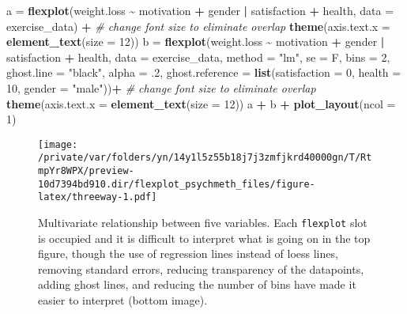 \documentclass[
  english,
  man]{apa6}
\newenvironment{Shaded}{\begin{snugshade}}{\end{snugshade}}
\newcommand{\CommentTok}[1]{\textcolor[rgb]{0.56,0.35,0.01}{\textit{#1}}}
\newcommand{\DataTypeTok}[1]{\textcolor[rgb]{0.13,0.29,0.53}{#1}}
\newcommand{\DecValTok}[1]{\textcolor[rgb]{0.00,0.00,0.81}{#1}}
\newcommand{\FloatTok}[1]{\textcolor[rgb]{0.00,0.00,0.81}{#1}}
\newcommand{\KeywordTok}[1]{\textcolor[rgb]{0.13,0.29,0.53}{\textbf{#1}}}
\newcommand{\NormalTok}[1]{#1}
\newcommand{\OperatorTok}[1]{\textcolor[rgb]{0.81,0.36,0.00}{\textbf{#1}}}
\newcommand{\StringTok}[1]{\textcolor[rgb]{0.31,0.60,0.02}{#1}}
\begin{document}
\begin{Shaded}
\begin{Highlighting}[]
\NormalTok{a =}\StringTok{ }\KeywordTok{flexplot}\NormalTok{(weight.loss }\OperatorTok{\textasciitilde{}}\StringTok{ }\NormalTok{motivation }\OperatorTok{+}\StringTok{ }\NormalTok{gender }\OperatorTok{|}\StringTok{ }\NormalTok{satisfaction }\OperatorTok{+}\StringTok{ }\NormalTok{health, }
    \DataTypeTok{data =}\NormalTok{ exercise\_data) }\OperatorTok{+}
\StringTok{  }\CommentTok{\# change font size to eliminate overlap}
\StringTok{    }\KeywordTok{theme}\NormalTok{(}\DataTypeTok{axis.text.x =} 
            \KeywordTok{element\_text}\NormalTok{(}\DataTypeTok{size =} \DecValTok{12}\NormalTok{))}
\NormalTok{b =}\StringTok{ }\KeywordTok{flexplot}\NormalTok{(weight.loss }\OperatorTok{\textasciitilde{}}\StringTok{ }\NormalTok{motivation }\OperatorTok{+}\StringTok{ }\NormalTok{gender }\OperatorTok{|}\StringTok{ }\NormalTok{satisfaction }\OperatorTok{+}\StringTok{ }\NormalTok{health, }
    \DataTypeTok{data =}\NormalTok{ exercise\_data, }
    \DataTypeTok{method =} \StringTok{"lm"}\NormalTok{, }\DataTypeTok{se =}\NormalTok{ F, }\DataTypeTok{bins =} \DecValTok{2}\NormalTok{, }\DataTypeTok{ghost.line =} \StringTok{"black"}\NormalTok{, }\DataTypeTok{alpha =} \FloatTok{.2}\NormalTok{,}
    \DataTypeTok{ghost.reference =} \KeywordTok{list}\NormalTok{(}\DataTypeTok{satisfaction =} \DecValTok{0}\NormalTok{, }\DataTypeTok{health =} \DecValTok{10}\NormalTok{, }\DataTypeTok{gender =} \StringTok{"male"}\NormalTok{))}\OperatorTok{+}
\StringTok{  }\CommentTok{\# change font size to eliminate overlap}
\StringTok{    }\KeywordTok{theme}\NormalTok{(}\DataTypeTok{axis.text.x =} 
            \KeywordTok{element\_text}\NormalTok{(}\DataTypeTok{size =} \DecValTok{12}\NormalTok{))}
\NormalTok{a }\OperatorTok{+}\StringTok{ }\NormalTok{b }\OperatorTok{+}\StringTok{ }\KeywordTok{plot\_layout}\NormalTok{(}\DataTypeTok{ncol =} \DecValTok{1}\NormalTok{)}
\end{Highlighting}
\end{Shaded}

\begin{figure}
\centering
\texttt{[image: /private/var/folders/yn/14y1l5z55b18j7j3zmfjkrd40000gn/T/RtmpYr8WPX/preview-10d7394bd910.dir/flexplot\_psychmeth\_files/figure-latex/threeway-1.pdf]}
\caption{\label{fig:threeway}Multivariate relationship between five variables. Each \texttt{flexplot} slot is occupied and it is difficult to interpret what is going on in the top figure, though the use of regression lines instead of loess lines, removing standard errors, reducing transparency of the datapoints, adding ghost lines, and reducing the number of bins have made it easier to interpret (bottom image). \label{fig:threeway}}
\end{figure}
\end{document}
